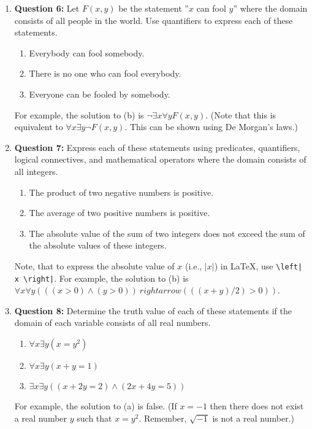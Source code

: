 \documentclass[11pt]{article}
\begin{document}
\begin{enumerate}
\item
\textbf{Question 6:}
Let $F(x,y)$ be the statement ''$x$ can fool $y$'' where the domain consists of all
people in the world. Use quantifiers to express each of these statements.
\begin{enumerate}[label=(\alph*)]
\item Everybody can fool somebody.
\item There is no one who can fool everybody.
\item Everyone can be fooled by somebody.
\end{enumerate}
For example, the solution to (b) is $\lnot \exists x \forall y F(x,y)$. (Note that
this is equivalent to $\forall x \exists y \lnot F(x,y)$. This can be shown using
De Morgan's laws.)
\item
\textbf{Question 7:}
Express each of these statements using predicates, quantifiers, logical
connectives, and mathematical operators where the domain consists of all integers.
\begin{enumerate}[label=(\alph*)]
\item The product of two negative numbers is positive.
\item The average of two positive numbers is positive.
\item The absolute value of the sum of two integers does not exceed the sum of the
absolute values of these integers.
\end{enumerate}
Note, that to express the absolute value of $x$ (i.e., $\left| x \right|$) in
LaTeX, use \verb!\left| x \right|!.
For example, the solution to (b) is $\forall x \forall y (((x>0) \land (y>0)) \
rightarrow (((x+y)/2)>0))$.
\item
\textbf{Question 8:}
Determine the truth value of each of these statements if the domain of each
variable consists of all real numbers.
\begin{enumerate}[label=(\alph*)]
\item $\forall x \exists y (x=y^2)$
\item $\forall x \exists y (x+y=1)$
\item $\exists x \exists y ((x+2y=2) \land (2x+4y=5))$
\end{enumerate}
For example, the solution to (a) is false. (If $x=-1$ then there does not exist a
real number $y$ such that $x=y^2$. Remember, $\sqrt{-1}$ is not a real number.)
\end{enumerate}
\end{document}

